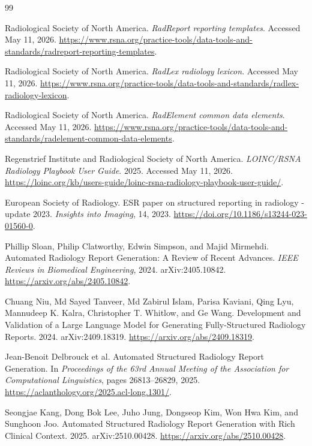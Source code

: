 \documentclass[11pt]{article}
\begin{document}
\begin{thebibliography}{99}

Radiological Society of North America. \emph{RadReport reporting templates}. Accessed May 11, 2026. \url{https://www.rsna.org/practice-tools/data-tools-and-standards/radreport-reporting-templates}.

Radiological Society of North America. \emph{RadLex radiology lexicon}. Accessed May 11, 2026. \url{https://www.rsna.org/practice-tools/data-tools-and-standards/radlex-radiology-lexicon}.

Radiological Society of North America. \emph{RadElement common data elements}. Accessed May 11, 2026. \url{https://www.rsna.org/practice-tools/data-tools-and-standards/radelement-common-data-elements}.

Regenstrief Institute and Radiological Society of North America. \emph{LOINC/RSNA Radiology Playbook User Guide}. 2025. Accessed May 11, 2026. \url{https://loinc.org/kb/users-guide/loinc-rsna-radiology-playbook-user-guide/}.

European Society of Radiology. ESR paper on structured reporting in radiology - update 2023. \emph{Insights into Imaging}, 14, 2023. \url{https://doi.org/10.1186/s13244-023-01560-0}.

Phillip Sloan, Philip Clatworthy, Edwin Simpson, and Majid Mirmehdi. Automated Radiology Report Generation: A Review of Recent Advances. \emph{IEEE Reviews in Biomedical Engineering}, 2024. arXiv:2405.10842. \url{https://arxiv.org/abs/2405.10842}.

Chuang Niu, Md Sayed Tanveer, Md Zabirul Islam, Parisa Kaviani, Qing Lyu, Mannudeep K. Kalra, Christopher T. Whitlow, and Ge Wang. Development and Validation of a Large Language Model for Generating Fully-Structured Radiology Reports. 2024. arXiv:2409.18319. \url{https://arxiv.org/abs/2409.18319}.

Jean-Benoit Delbrouck et al. Automated Structured Radiology Report Generation. In \emph{Proceedings of the 63rd Annual Meeting of the Association for Computational Linguistics}, pages 26813--26829, 2025. \url{https://aclanthology.org/2025.acl-long.1301/}.

Seongjae Kang, Dong Bok Lee, Juho Jung, Dongseop Kim, Won Hwa Kim, and Sunghoon Joo. Automated Structured Radiology Report Generation with Rich Clinical Context. 2025. arXiv:2510.00428. \url{https://arxiv.org/abs/2510.00428}.


\end{thebibliography}
\end{document}
